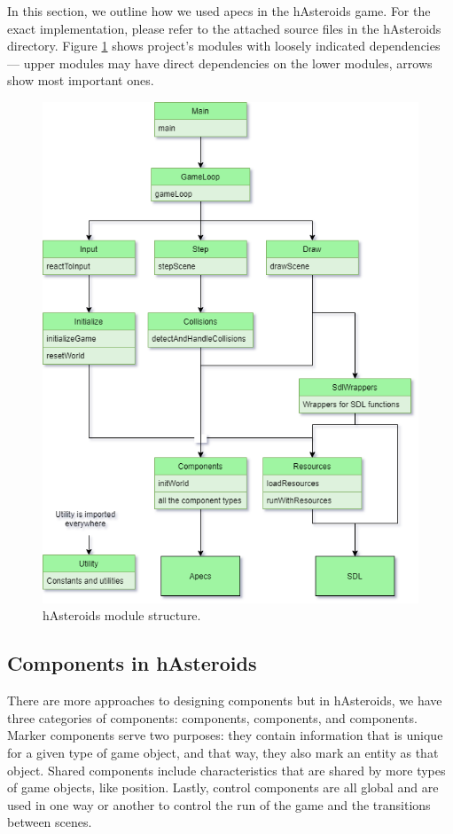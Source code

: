 \documentclass[
  digital, %
  color,   %
  table,   %
  oneside, %
  lof,     %
  lot,     %
]{fithesis3}
\begin{document}
\noindent In this section, we outline how we used apecs in the hAsteroids game.
For the exact implementation, please refer to the attached source files in the hAsteroids directory.
Figure \ref{fig:hasteroidsmodules} shows project's modules with loosely indicated
dependencies --- upper modules may have direct dependencies on the lower modules,
arrows show most important ones. %
\begin{figure}
    \centering
    \includegraphics[width=\textwidth]{images/modules.png}
    \caption{hAsteroids module structure.}
    \label{fig:hasteroidsmodules}
\end{figure}


\subsection{Components in hAsteroids}
There are more approaches to designing components but in hAsteroids,
we have three categories of components:  components,
 components, and  components. Marker components serve two purposes:
they contain information that is unique for a given type of game object,
and that way, they also mark an entity as that object.
Shared components include characteristics that are shared by more types
of game objects, like position. Lastly, control components are all global
and are used in one way or another to control the run of the game and the transitions between scenes.
\end{document}
